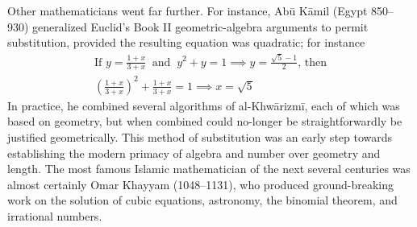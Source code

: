 

Other mathematicians went far further. For instance, Abū Kāmil (Egypt 850--930) generalized Euclid's Book II geometric-algebra arguments to permit substitution, provided the resulting equation was quadratic; for instance
\begin{gather*}
\text{If }y=\frac{1+x}{3+x}\ \text{ and }\ y^2+y=1\implies y=\frac{\sqrt 5 -1}2\text{, then}\\[2pt]
\left(\frac{1+x}{3+x}\right)^2+\frac{1+x}{3+x}=1\implies x=\sqrt 5
\end{gather*}
In practice, he combined several algorithms of al-Khwārizmī, each of which was based on geometry, but when combined could no-longer be straightforwardly be justified geometrically. This method of substitution was an early step towards establishing the modern primacy of algebra and number over geometry and length.\smallbreak
The most famous Islamic mathematician of the next several centuries was almost certainly Omar Khayyam (1048--1131), who produced ground-breaking work on the solution of cubic equations, astronomy, the binomial theorem, and irrational numbers. %


